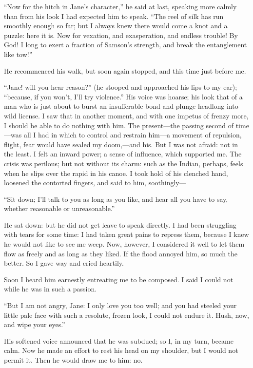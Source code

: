 \enquote{Now for the hitch in Jane's character,} he said at last,
speaking more calmly than from his look I had expected him to speak.
\enquote{The reel of silk has run smoothly enough so far; but I always
	knew there would come a knot and a puzzle: here it is. Now for
	vexation, and exasperation, and endless trouble! By God! I long to
	exert a fraction of Samson's strength, and break the entanglement like
	tow!}

He recommenced his walk, but soon again stopped, and this time just
before me.

\enquote{Jane! will you hear reason?} (he stooped and approached his
lips to my ear); \enquote{because, if you won't, I'll try violence.}
His voice was hoarse; his look that of a man who is just about to burst
an insufferable bond and plunge headlong into wild license. I saw that
in another moment, and with one impetus of frenzy more, I should be able
to do nothing with him. The present---the passing second of time---was
all I had in which to control and restrain him---a movement of
repulsion, flight, fear would have sealed my doom,---and his. But I was
not afraid: not in the least. I felt an inward power; a sense of
influence, which supported me. The crisis was perilous; but not without
its charm: such as the Indian, perhaps, feels when he slips over the
rapid in his canoe. I took hold of his clenched hand, loosened the
contorted fingers, and said to him, soothingly---

\enquote{Sit down; I'll talk to you as long as you like, and hear all
	you have to say, whether reasonable or unreasonable.}

He sat down: but he did not get leave to speak directly. I had been
struggling with tears for some time: I had taken great pains to repress
them, because I knew he would not like to see me weep. Now, however, I
considered it well to let them flow as freely and as long as they
liked. If the flood annoyed him, so much the better. So I gave way and
cried heartily.

Soon I heard him earnestly entreating me to be composed. I said I could
not while he was in such a passion.

\enquote{But I am not angry, Jane: I only love you too well; and you had
	steeled your little pale face with such a resolute, frozen look, I could
	not endure it. Hush, now, and wipe your eyes.}

His softened voice announced that he was subdued; so I, in my turn,
became calm. Now he made an effort to rest his head on my shoulder, but
I would not permit it. Then he would draw me to him: no.

